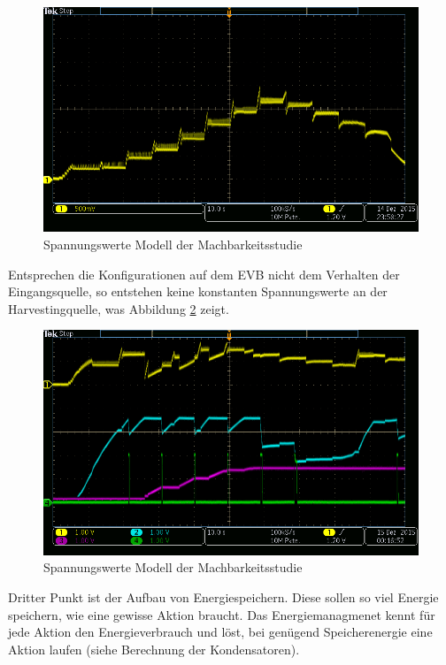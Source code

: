 \begin{figure}    
    \includegraphics{2TheoretischeGrundlagen/imag/RegelungVHRV.png}
    \caption{Spannungswerte Modell der Machbarkeitsstudie}\label{RegelungSpannung} 
\end{figure}

Entsprechen die Konfigurationen auf dem EVB nicht dem Verhalten der Eingangsquelle, so entstehen keine konstanten Spannungswerte an der Harvestingquelle, was Abbildung \ref{falscheRegelung} zeigt.

\begin{figure}
    \includegraphics{2TheoretischeGrundlagen/imag/falscheRegelung.png}
    \caption{Spannungswerte Modell der Machbarkeitsstudie}\label{falscheRegelung} 
\end{figure}

Dritter Punkt ist der Aufbau von Energiespeichern. Diese sollen so viel Energie speichern, wie eine gewisse Aktion braucht. Das Energiemanagmenet kennt für jede Aktion den Energieverbrauch und löst, bei genügend Speicherenergie eine Aktion laufen (siehe Berechnung der Kondensatoren).

